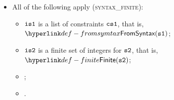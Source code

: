 \begin{itemize}
  \item All of the following apply (\textsc{syntax\_finite}):
  \begin{itemize}
    \item $\visone$ is a list of constraints $\csone$, that is, $\FromSyntax(\vsone)$;
    \item $\vistwo$ is a finite set of integers for $\vstwo$, that is, $\Finite(\vstwo)$;
    \item \ProseapproxconstraintsOver{$\tenv$}{$\csone$}{$\vsone$};
    \item {}.
  \end{itemize}
\end{itemize}

\FormallyParagraph
\begin{mathpar}
\end{mathpar}

\begin{mathpar}
\end{mathpar}

\begin{mathpar}
\end{mathpar}

\begin{mathpar}
\end{mathpar}

\begin{mathpar}
\end{mathpar}

